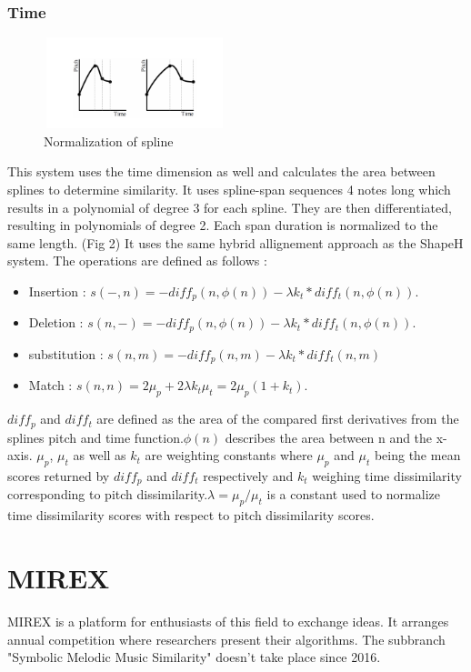 \documentclass{llncs}
\begin{document}
		\subsubsection{Time}
        \begin{figure}[h!]
			\centering
		  \includegraphics[width=200px,height=100px,keepaspectratio]{two_of_five_point_one}
			\caption{Normalization of spline \cite{five_point_two}}
        \end{figure}
        This system uses the time dimension as well and calculates the area between splines to determine similarity. It uses spline-span sequences 4 notes long which results in a polynomial of degree 3 for each spline. They are then differentiated, resulting in polynomials of degree 2. Each span duration is normalized to the same length. (Fig 2)
        It uses the same hybrid allignement approach as the ShapeH system. 
		The operations are defined as follows : 
        \begin{itemize}
         \item Insertion : 
        $ s(-,n) = -diff _p(n, \phi(n)) - \lambda k_t * diff_t(n, \phi(n)).$
        \item Deletion : 
         $s(n,-) = -diff_p(n, \phi(n)) - \lambda k_t * diff_t (n, \phi(n)).$
       \item substitution : 
       $s(n,m) = - diff_p (n,m) - \lambda k_t * diff_t (n,m) $
       \item Match : 
        $s(n,n) = 2\mu_p + 2\lambda k_t \mu_t = 2\mu_p (1+k_t).$
        \end{itemize}
        
        $diff_p$ and $diff_t$ are defined as the area of the compared first derivatives from the splines pitch and time function.$ \phi(n)$ describes the area between n and the x-axis. $\mu_p$, $\mu_t$ as well as $k_t$ are weighting constants where $\mu_p$ and $\mu_t$ being the mean scores returned by $diff_p$ and $diff_t$ respectively and $k_t$ weighing time dissimilarity corresponding to pitch dissimilarity.$ \lambda = \mu_p / \mu_t$ is a constant used to normalize time dissimilarity scores with respect to pitch dissimilarity scores.
	\section{MIREX}
		MIREX is a platform for enthusiasts of this field to exchange ideas. It arranges annual competition where researchers present their algorithms. The subbranch "Symbolic Melodic Music Similarity" doesn't take place since 2016. 
\end{document}
